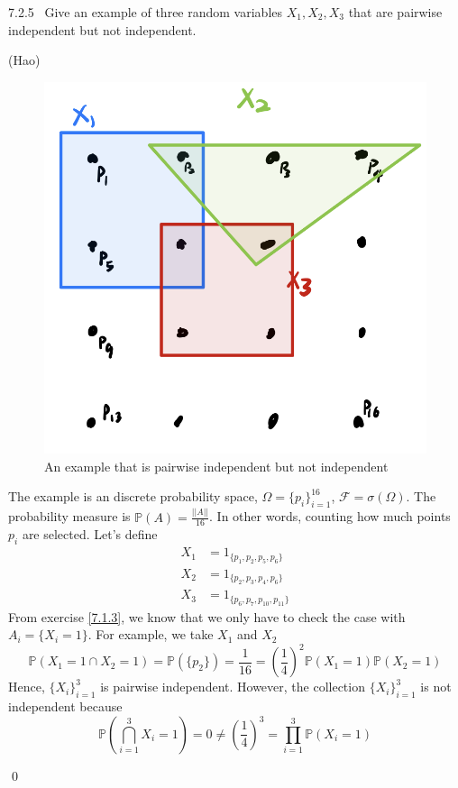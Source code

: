 \begin{exercise}7.2.5 \ 
    Give an example of three random variables $X_1, X_2, X_3$ that are pairwise independent but not independent.
\end{exercise}
\begin{answer}(Hao) \\
    \begin{figure}[!h]
        \centering
        \includegraphics[width=\textwidth/3]{Note/Figures/7.2.5.png}
        \caption{An example that is pairwise independent but not independent}
    \end{figure}
    
    The example is an discrete probability space,
    $\Omega = \{p_i\}_{i=1}^{16}$, $\mathcal{F} = \sigma(\Omega)$. The probability measure is $\mathbb{P}(A) = \frac{||A||}{16}$. In other words, counting how much points $p_i$ are selected. 
    Let's define 
    \begin{equation*}
        \begin{aligned}
            X_1 &= 1_{ \{p_1,p_2,p_5,p_6 \} } \\
            X_2 &= 1_{ \{p_2,p_3,p_4,p_6 \} } \\
            X_3 &= 1_{ \{p_6,p_7,p_{10},p_{11} \} } 
        \end{aligned}
    \end{equation*}
    From exercise \ref{7.1.3}, we know that we only have to check the case with $A_i = \{ X_i = 1\}$. For example, we take $X_1$ and $X_2$
    $$
        \mathbb{P}(X_1 = 1 \cap X_2 = 1) = \mathbb{P}(\{p_2\}) = \frac{1}{16} = (\frac{1}{4})^2 \mathbb{P}(X_1 = 1 )\mathbb{P}( X_2 = 1)
    $$
    Hence, $\{ X_i\}_{i=1}^3$ is pairwise independent. However, the collection $\{ X_i\}_{i=1}^3$ is not independent because
    $$\mathbb{P}(\bigcap\limits_{i=1}^3 X_i = 1) = 0 \neq (\frac{1}{4})^3 = \prod\limits_{i=1}^3 \mathbb{P}( X_i = 1)$$
    
    
\end{answer}\qed \qquad

